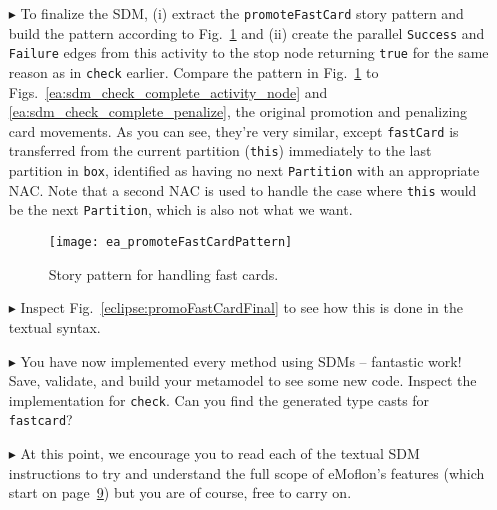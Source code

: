 \begin{itemize}
\item[$\blacktriangleright$] To finalize the SDM, (i) extract the \texttt{promoteFastCard} story pattern and build the pattern according to
Fig.~\ref{ea:promoteFastCardPattern} and (ii) create the parallel \texttt{Success} and \texttt{Failure} edges from this activity to the stop node returning 
\texttt{true} for the same reason as in \texttt{check} earlier. Compare the pattern in Fig.~\ref{ea:promoteFastCardPattern} to Figs.~\ref{ea:sdm_check_complete_activity_node} and \ref{ea:sdm_check_complete_penalize}, the
original promotion and penalizing card movements. As you can see, they're very similar, except \texttt{fastCard} is transferred from the current partition
(\texttt{this}) immediately to the last partition in \texttt{box}, identified as having no next \texttt{Partition} with an appropriate NAC.
Note that a second NAC is used to handle the case where \texttt{this} would be the next \texttt{Partition}, which is also not what we want.

\begin{figure}[htbp] 
\begin{center}
  \texttt{[image: ea\_promoteFastCardPattern]}
  \caption{Story pattern for handling fast cards.}  
  \label{ea:promoteFastCardPattern}
\end{center}
\end{figure}

\item[$\blacktriangleright$] Inspect Fig.~\ref{eclipse:promoFastCardFinal} to see how this is done in the textual syntax.

\item[$\blacktriangleright$] You have now implemented every method using SDMs -- fantastic work! Save, validate, and build your metamodel to see some new code.
Inspect the implementation for \texttt{check}.  Can you find the generated type casts for \texttt{fastcard}?

\item[$\blacktriangleright$] At this point, we encourage you to read each of the textual SDM instructions to try and understand the full scope of eMoflon's
features (which start on page~\hyperlink{page.9}{9}) but you are of course, free to carry on.


\end{itemize}
